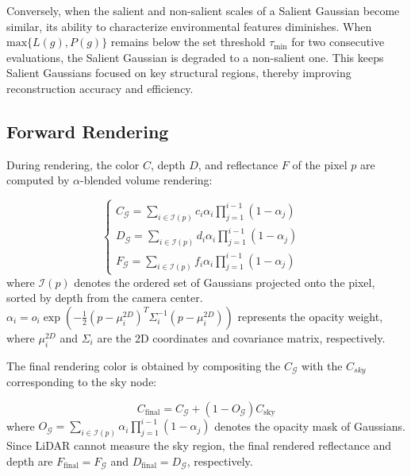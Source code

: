 \documentclass[letterpaper, 10 pt, conference]{ieeeconf}  %
\begin{document}
Conversely, when the salient and non-salient scales of a Salient Gaussian become similar, its ability to characterize environmental features diminishes. When ${\text{max}}\{{L(g), P(g)}\}$ remains below the set threshold $\tau_{\text{min}}$ for two consecutive evaluations, the Salient Gaussian is degraded to a non-salient one. This keeps Salient Gaussians focused on key structural regions, thereby improving reconstruction accuracy and efficiency.



\subsection{Forward Rendering}

During rendering, the color $C$, depth $D$, and reflectance $F$ of the pixel $p$ are computed by $\alpha$-blended volume rendering:

\begin{equation}
	\label{eq9}
\begin{cases}
C_\mathcal{G}=\sum_{i \in \mathcal{I}(p)} {c}_{i} \alpha_{i} \prod_{j=1}^{i-1}\left(1-\alpha_{j}\right) \\
D_\mathcal{G}=\sum_{i \in \mathcal{I}(p)} {d}_{i} \alpha_{i} \prod_{j=1}^{i-1}\left(1-\alpha_{j}\right) \\
F_\mathcal{G}=\sum_{i \in \mathcal{I}(p)} {f}_{i} \alpha_{i} \prod_{j=1}^{i-1}\left(1-\alpha_{j}\right) & 
\end{cases}
\end{equation}
where $\mathcal{I}(p)$ denotes the ordered set of Gaussians projected onto the pixel, sorted by depth from the camera center. $\alpha_{i}=o_{i} \exp \left(-\frac{1}{2}(p-\mu_{i}^{2D})^{T} \Sigma_{i}^{-1}(p-\mu_{i}^{2D})\right)$ represents the opacity weight, where $\mu_{i}^{2D}$ and $\Sigma_{i}$ are the 2D coordinates and covariance matrix, respectively.

The final rendering color is obtained by compositing the $C_\mathcal{G}$ with the $C_{sky}$ corresponding to the sky node:

\begin{equation}
	\label{eq10}
C_{\mathrm{final}}=C_{\mathcal{G}}+\left(1-O_{\mathcal{G}}\right) C_{\mathrm{sky}}
\end{equation}
where $O_{\mathcal{G}}=\sum_{i \in \mathcal{I}(p)} \alpha_{i} \prod_{j=1}^{i-1}(1-\alpha_{j})$ denotes the opacity mask of Gaussians. Since LiDAR cannot measure the sky region, the final rendered reflectance and depth are $F_{\mathrm{final}} = F_\mathcal{G}$ and $D_{\mathrm{final}} = D_\mathcal{G}$, respectively.
\end{document}
